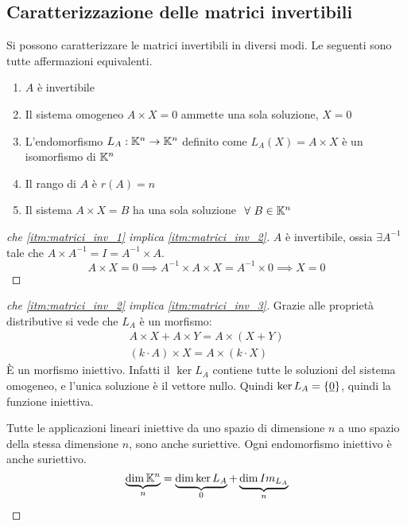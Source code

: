 \subsection{Caratterizzazione delle matrici invertibili}

Si possono caratterizzare le matrici invertibili in diversi modi. Le seguenti sono tutte affermazioni equivalenti.
\begin{enumerate}
    \item\label{itm:matrici_inv_1} $A$ \`e invertibile
    \item\label{itm:matrici_inv_2} Il sistema omogeneo $A \times X = 0$ ammette una sola soluzione, $X = 0$
    \item\label{itm:matrici_inv_3} L'endomorfismo $L_A : \mathbb{K}^n \to \mathbb{K}^n$ definito come $L_A (X) = A \times X$ \`e un isomorfismo di $\mathbb{K}^n$
    \item\label{itm:matrici_inv_4} Il rango di $A$ \`e $r(A) = n$
    \item\label{itm:matrici_inv_5} Il sistema $A \times X = B$ ha una sola soluzione $\forall B \in \field^n$
\end{enumerate}

\begin{proof}[che \ref{itm:matrici_inv_1} implica \ref{itm:matrici_inv_2}]
$A$ \`e invertibile, ossia $\exists A^{-1}$ tale che $A \times A^{-1} = I = A^{-1} \times A$.
\[
A \times X = 0 \implies A^{-1} \times A \times X = A^{-1} \times 0 \implies X = 0
\]
\end{proof}

\begin{proof}[che \ref{itm:matrici_inv_2} implica \ref{itm:matrici_inv_3}]
Grazie alle propriet\`a distributive si vede che $L_A$ \`e un morfismo:
\begin{gather*}
A \times X + A \times Y = A \times (X + Y) \\
(k \cdot A) \times X = A \times (k \cdot X)
\end{gather*}
\`E un morfismo iniettivo. Infatti il $\ker L_A$ contiene tutte le soluzioni del sistema omogeneo, e l'unica soluzione \`e il vettore nullo. Quindi $\ker L_A = \{ \underline{0} \}$, quindi la funzione iniettiva.

Tutte le applicazioni lineari iniettive da uno spazio di dimensione $n$ a uno spazio della stessa dimensione $n$, sono anche suriettive. Ogni endomorfismo iniettivo \`e anche suriettivo.
\[
\underbrace{\dim \mathbb{K}^n}_{n} = \underbrace{\dim \ker L_A}_{0} + \underbrace{\dim Im_{L_A}}_{n}
\]
\end{proof}

